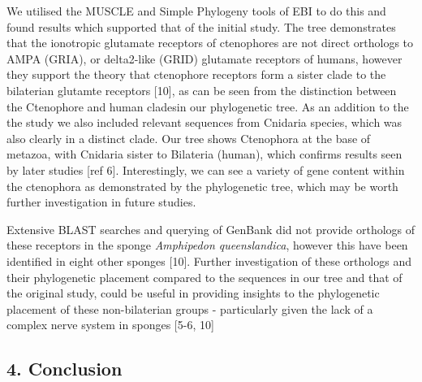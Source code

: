 \documentclass[
]{article}
\begin{document}
We utilised the MUSCLE and Simple Phylogeny tools of EBI to do this and
found results which supported that of the initial study. The tree
demonstrates that the ionotropic glutamate receptors of ctenophores are
not direct orthologs to AMPA (GRIA), or delta2-like (GRID) glutamate
receptors of humans, however they support the theory that ctenophore
receptors form a sister clade to the bilaterian glutamte receptors
{[}10{]}, as can be seen from the distinction between the Ctenophore and
human cladesin our phylogenetic tree. As an addition to the the study we
also included relevant sequences from Cnidaria species, which was also
clearly in a distinct clade. Our tree shows Ctenophora at the base of
metazoa, with Cnidaria sister to Bilateria (human), which confirms
results seen by later studies {[}ref 6{]}. Interestingly, we can see a
variety of gene content within the ctenophora as demonstrated by the
phylogenetic tree, which may be worth further investigation in future
studies.

Extensive BLAST searches and querying of GenBank did not provide
orthologs of these receptors in the sponge \emph{Amphipedon
queenslandica}, however this have been identified in eight other sponges
{[}10{]}. Further investigation of these orthologs and their
phylogenetic placement compared to the sequences in our tree and that of
the original study, could be useful in providing insights to the
phylogenetic placement of these non-bilaterian groups - particularly
given the lack of a complex nerve system in sponges {[}5-6, 10{]}

\hypertarget{conclusion}{%
\subsection{4. Conclusion}\label{conclusion}}
\end{document}
